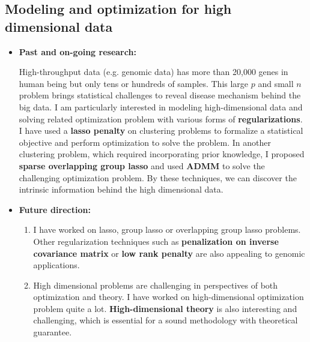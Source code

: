 \documentclass[a4paper, 10pt]{article}
\begin{document}
\subsection{Modeling and optimization for high dimensional data}
\begin{itemize}
\item \textbf{Past and on-going research:}

High-throughput data (e.g. genomic data) has more than 20,000 genes in human being but only tens or hundreds of samples.
This large $p$ and small $n$ problem brings statistical challenges to reveal disease mechanism behind the big data.
I am particularly interested in modeling high-dimensional data and solving related optimization problem with various forms of \textbf{regularizations}.
I have used a \textbf{lasso penalty} on clustering problems to formalize a statistical objective and perform optimization to solve the problem\cite{ref:MSKM}.
In another clustering problem, which required incorporating prior knowledge, 
I proposed \textbf{sparse overlapping group lasso} and used \textbf{ADMM} to solve the challenging optimization problem\cite{ref:ISKmeans}.
By these techniques, we can discover the intrinsic information behind the high dimensional data.

\item \textbf{Future direction:}
\begin{enumerate}
\item I have worked on lasso, group lasso or overlapping group lasso problems.
Other regularization techniques such as \textbf{penalization on inverse covariance matrix} or \textbf{low rank penalty} are also appealing to genomic applications.
\item High dimensional problems are challenging in perspectives of both optimization and theory.
I have worked on high-dimensional optimization problem quite a lot.
\textbf{High-dimensional theory} is also interesting and challenging, which is essential for a  sound methodology with theoretical guarantee. 
\end{enumerate}

\end{itemize}
\end{document}
